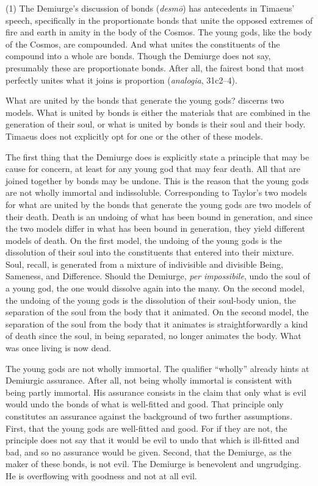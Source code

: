 (1) The Demiurge's discussion of bonds (\emph{desmō}) has antecedents in Timaeus' speech, specifically in the proportionate bonds that unite the opposed extremes of fire and earth in amity in the body of the Cosmos. The young gods, like the body of the Cosmos, are compounded. And what unites the constituents of the compound into a whole are bonds. Though the Demiurge does not say, presumably these are proportionate bonds. After all, the fairest bond that most perfectly unites what it joins is proportion (\emph{analogia}, 31c2--4). 

What are united by the bonds that generate the young gods? \citet[]{Taylor:1928qb} discerns two models. What is united by bonds is either the materials that are combined in the generation of their soul, or what is united by bonds is their soul and their body. Timaeus does not explicitly opt for one or the other of these models.

The first thing that the Demiurge does is explicitly state a principle that may be cause for concern, at least for any young god that may fear death. All that are joined together by bonds may be undone. This is the reason that the young gods are not wholly immortal and indissoluble. Corresponding to Taylor's two models for what are united by the bonds that generate the young gods are two models of their death. Death is an undoing of what has been bound in generation, and since the two models differ in what has been bound in generation, they yield different models of death. On the first model, the undoing of the young gods is the dissolution of their soul into the constituents that entered into their mixture. Soul, recall, is generated from a mixture of indivisible and divisible Being, Sameness, and Difference. Should the Demiurge, \emph{per impossibile}, undo the soul of a young god, the one would dissolve again into the many. On the second model, the undoing of the young gods is the dissolution of their soul-body union, the separation of the soul from the body that it animated. On the second model, the separation of the soul from the body that it animates is straightforwardly a kind of death since the soul, in being separated, no longer animates the body. What was once living is now dead. 

The young gods are not wholly immortal. The qualifier ``wholly'' already hints at Demiurgic assurance. After all, not being wholly immortal is consistent with being partly immortal. His assurance consists in the claim that only what is evil would undo the bonds of what is well-fitted and good. That principle only constitutes an assurance against the background of two further assumptions. First, that the young gods are well-fitted and good. For if they are not, the principle does not say that it would be evil to undo that which is ill-fitted and bad, and so no assurance would be given. Second, that the Demiurge, as the maker of these bonds, is not evil. The Demiurge is benevolent and ungrudging. He is overflowing with goodness and not at all evil. 

